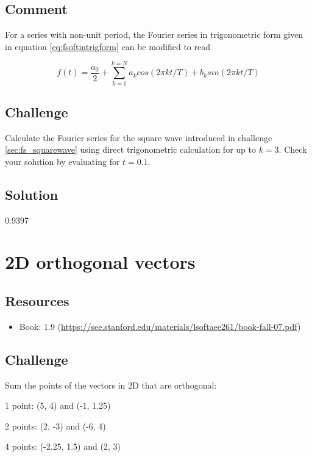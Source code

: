 \subsection*{Comment}
For a series with non-unit period, the Fourier series in trigonometric form given in equation \ref{eq:fsoftintrigform} can be modified to read

\begin{equation}
    \label{eq:fstrignonunit}
    f(t) = \frac{a_0}{2} + \sum_{k=1}^{k=N} a_k cos(2 \pi k t/T) + b_k sin(2 \pi k t/T)
\end{equation}

\subsection*{Challenge}
Calculate the Fourier series for the square wave introduced in challenge \ref{sec:fs_squarewave} using direct trigonometric calculation for up to $k=3$. Check your solution by evaluating for $t=0.1$.

\subsection*{Solution}
0.9397





\newpage
\section{2D orthogonal vectors}

\subsection*{Resources}
\begin{itemize}
    \item Book: 1.9 (\url{https://see.stanford.edu/materials/lsoftaee261/book-fall-07.pdf})
\end{itemize}

\subsection*{Challenge}
Sum the points of the vectors in 2D that are orthogonal:

1 point: (5, 4) and (-1, 1.25)

2 points:  (2, -3) and (-6, 4)

4 points: (-2.25, 1.5) and (2, 3)

